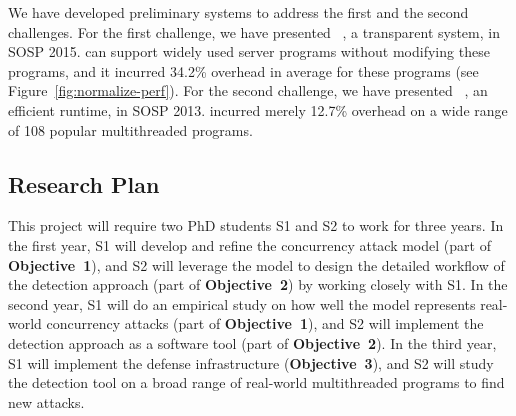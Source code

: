 




 We have developed preliminary systems to 
address the first and the second challenges. For the first challenge, we have 
presented \crane~\cite{crane:sosp15}, a transparent \smr system, in SOSP 2015. 
\crane can support widely used server programs without modifying these programs, 
and it incurred 34.2\% overhead in average for these programs (see 
Figure~\ref{fig:normalize-perf}). For the second challenge, we have presented 
\parrot~\cite{parrot:sosp13}, an efficient \dmt runtime, in SOSP 2013. \parrot 
incurred merely 12.7\% overhead on a wide range of 108 popular multithreaded 
programs.

\vspace{-.15in}\subsection{Research Plan} \label{sec:plan}\vspace{-.075in}

This project will require two PhD students S1 and S2 to work for 
three years. In the first year, S1 will develop and refine the concurrency 
attack model (part of \textbf{Objective~1}), and S2 will leverage the model to 
design the detailed workflow of the detection approach (part of 
\textbf{Objective~2}) by working closely with S1. In the second year, S1 will 
do an empirical study on how well the model represents real-world concurrency 
attacks (part of \textbf{Objective~1}), and S2 will implement the detection 
approach as a software tool (part of \textbf{Objective~2}). In the third year, 
S1 will implement the defense infrastructure (\textbf{Objective~3}), and S2 
will study the detection tool on a broad range of real-world multithreaded 
programs to find new attacks.


